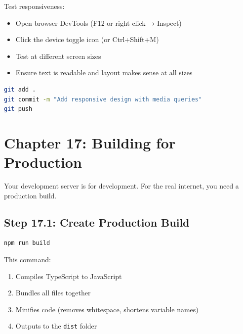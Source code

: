 \documentclass[12pt,a4paper]{article}
\begin{document}
\begin{checkpoint}
Test responsiveness:
\begin{itemize}
    \item[$\square$] Open browser DevTools (F12 or right-click → Inspect)
    \item[$\square$] Click the device toggle icon (or Ctrl+Shift+M)
    \item[$\square$] Test at different screen sizes
    \item[$\square$] Ensure text is readable and layout makes sense at all sizes
\end{itemize}
\end{checkpoint}

\begin{gitcommit}
\begin{lstlisting}[language=bash]
git add .
git commit -m "Add responsive design with media queries"
git push
\end{lstlisting}
\end{gitcommit}

\section{Chapter 17: Building for Production}

Your development server is for development. For the real internet, you need a production build.

\subsection{Step 17.1: Create Production Build}

\begin{lstlisting}[language=bash,caption={Build command}]
npm run build
\end{lstlisting}

\begin{explanation}
This command:
\begin{enumerate}
    \item Compiles TypeScript to JavaScript
    \item Bundles all files together
    \item Minifies code (removes whitespace, shortens variable names)
    \item Outputs to the \texttt{dist} folder
\end{enumerate}
\end{explanation}
\end{document}
